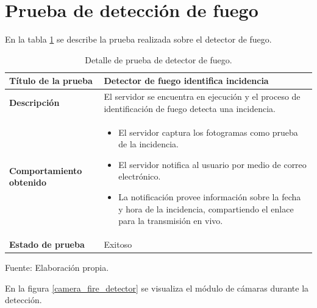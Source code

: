\section{Prueba de detección de fuego}

En la tabla \ref{table_fire_detection} se describe la prueba realizada sobre el detector de fuego.\\

\begin{table}[H]
    \caption{Detalle de prueba de detector de fuego.}
    \begin{center}
        \begin{tabular}{|>{\centering}p{}|m{}<{\centering}|} 
            \hline
            \textbf{Título de la prueba} & \textbf{Detector de fuego identifica incidencia} \\
            \hline
            \textbf{Descripción} & El servidor se encuentra en ejecución y el proceso de identificación de fuego detecta una incidencia.\\
            \hline
            \textbf{Comportamiento obtenido} & 
            \begin{itemize}
                \item El servidor captura los fotogramas como prueba de la incidencia.
                \item El servidor notifica al usuario por medio de correo electrónico.
                \item La notificación provee información sobre la fecha y hora de la incidencia, compartiendo el enlace para la transmisión en vivo.
            \end{itemize} \\ 
            \hline
            \textbf{Estado de prueba} & Exitoso \\
            \hline
        \end{tabular}
    \end{center}
    \begin{center}
        Fuente: Elaboración propia.
        \label{table_fire_detection}
    \end{center}
\end{table}

En la figura \ref{camera_fire_detector} se visualiza el módulo de cámaras durante la detección.

